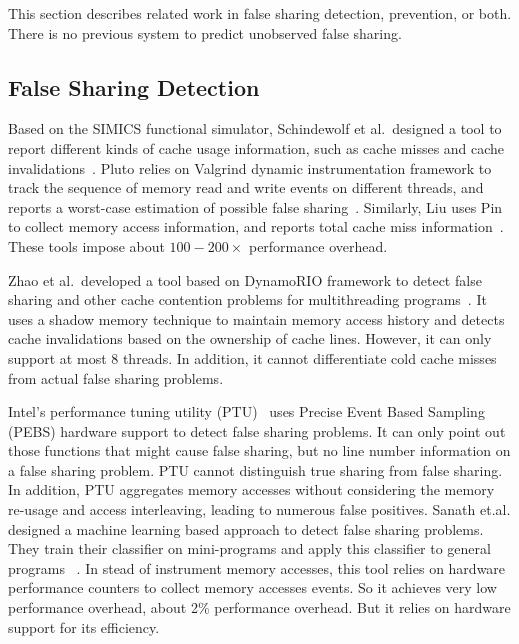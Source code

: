 \label{sec:relatedwork}

This section describes related work in false sharing detection, prevention, or both. There is no previous
system to predict unobserved false sharing.

\subsection{False Sharing Detection}
Based on the SIMICS functional simulator, Schindewolf et al.\ designed a tool to report different kinds of cache usage information, such as cache misses and cache invalidations~\cite{falseshare:simulator}. Pluto relies on Valgrind dynamic instrumentation framework to track the sequence of memory read and write events on different threads, and reports a worst-case estimation of possible false sharing~\cite{falseshare:binaryinstrumentation1}.
Similarly, Liu uses Pin to collect memory access information, and reports total cache miss information~\cite{falseshare:binaryinstrumentation2}.
These tools impose about $100-200\times$ performance overhead.

Zhao et al.\ developed a tool based on DynamoRIO framework to detect false sharing and other cache contention problems
for multithreading programs~\cite{qinzhaodetection}. 
It uses a shadow memory technique to maintain memory access history and detects cache invalidations based on the ownership of cache lines. However, it can only support at most $8$ threads. In addition, it cannot differentiate cold cache misses from actual false sharing problems.

Intel's performance tuning utility (PTU)~\cite{detect:ptu, detect:intel} uses Precise Event Based Sampling (PEBS) hardware support to detect false sharing problems.  It can only point out those functions that might cause false sharing, but no line number information on a false sharing problem.  PTU cannot distinguish true sharing from false sharing. In addition, PTU aggregates memory accesses without considering the memory re-usage and access interleaving, leading to numerous false positives. Sanath et.al. designed a machine learning based approach to detect false sharing problems. They train their classifier on mini-programs and apply this classifier to general programs ~\cite{mldetect}. In stead of instrument memory accesses, this tool relies on hardware performance counters to collect memory accesses events. So it achieves very low performance overhead, about 2\% performance overhead. But it relies on hardware support for its efficiency.  

